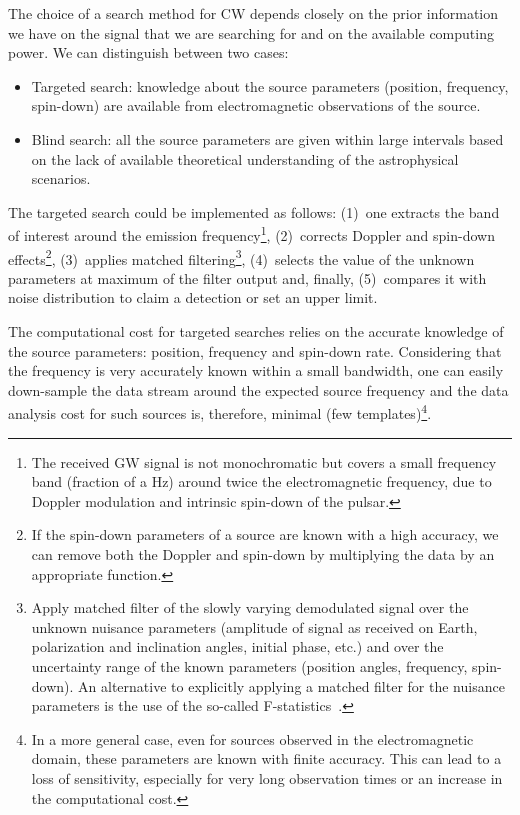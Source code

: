 The choice of a search method for CW depends closely on the 
prior information we have on the signal that we are searching 
for and on the available computing power. We can distinguish 
between two cases: 
\begin{itemize}
\item Targeted search: knowledge about the source parameters 
(position, frequency, spin-down) are available from 
electromagnetic observations of the source.
\item Blind search: all the source parameters are given 
within large intervals based on the lack of available 
theoretical understanding of the astrophysical scenarios. 
\end{itemize}
%
The targeted search could be implemented as follows:  
(1)~one extracts the band of interest around the 
emission frequency\footnote{The received GW signal is not
monochromatic but covers a small frequency band (fraction 
of a Hz) around twice the electromagnetic frequency, due to 
Doppler modulation and intrinsic spin-down of the pulsar.},   
(2)~corrects Doppler and spin-down 
effects\footnote{If the spin-down parameters of a source 
are known with a high accuracy,  we can remove both the 
Doppler and spin-down by multiplying the data by an appropriate 
function.}, (3)~applies matched filtering\footnote{Apply 
matched filter of the slowly varying 
demodulated signal over the unknown nuisance parameters 
(amplitude of signal as received on Earth, polarization 
and inclination angles, initial phase, etc.) and over the 
uncertainty range of the known parameters (position angles, 
frequency, spin-down).  An alternative to explicitly 
applying a matched filter for the nuisance parameters is the 
use of the so-called F-statistics~\cite{ItohFStatistic}.},  
(4)~selects the value of the unknown parameters at maximum 
of the filter output and, finally, (5)~compares it 
with noise distribution to claim a detection or set an 
upper limit.  

The computational cost for targeted searches relies on the 
accurate knowledge of the source parameters: position, 
frequency and spin-down rate.
Considering that the frequency is very accurately known 
within a small bandwidth, one can easily down-sample the 
data stream around the expected source frequency and the 
data analysis cost for such sources is, therefore, minimal 
(few templates)\footnote{In a more general case, even for 
sources observed in the electromagnetic domain, these 
parameters are known with finite accuracy. This can lead 
to a loss of sensitivity, especially for very long 
observation times or an increase in the computational 
cost.}. 

